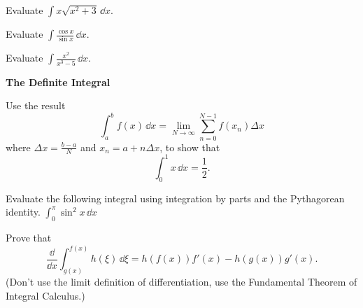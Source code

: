 \begin{Exercise}
  \label{exercise int x sqrt x2+3}
  Evaluate $\int x \sqrt{x^2+3}\,\dd x$.

\end{Exercise}



\begin{Exercise}
  \label{exercise int cos x / sin x}
  Evaluate $\int \frac{\cos x}{\sin x}\,\dd x$.

\end{Exercise}



\begin{Exercise}
  \label{exercise int x2 / x3-5}
  Evaluate $\int \frac{x^2}{x^3-5}\,\dd x$.

\end{Exercise}



\begin{large}
  \noindent
  \textbf{The Definite Integral}
\end{large}


\begin{Exercise}
  \label{exercise int by sum x}
  Use the result
  \[
  \int_a^b f(x)\,\dd x = \lim_{N \to \infty} \sum_{n=0}^{N-1} f(x_n) \Delta x
  \]
  where $\Delta x = \frac{b-a}{N}$ and $x_n = a + n \Delta x$, to show that
  \[
  \int_0^1 x \,\dd x = \frac{1}{2}.
  \]

\end{Exercise}



\begin{Exercise}
  \label{exercise int 0 pi sin2 x}
  Evaluate the following integral using integration by parts and the 
  Pythagorean identity.
  $\int_0^\pi \sin^2 x \,\dd x$

\end{Exercise}



\begin{Exercise}
  \label{exercise d/dx int g f h}
  Prove that
  \[
  \frac{\dd}{\dd x} \int_{g(x)}^{f(x)} h(\xi) \,\dd \xi = h(f(x))f'(x) - h(g(x))g'(x).
  \]
  (Don't use the limit definition of differentiation, use the Fundamental
  Theorem of Integral Calculus.)

\end{Exercise}







